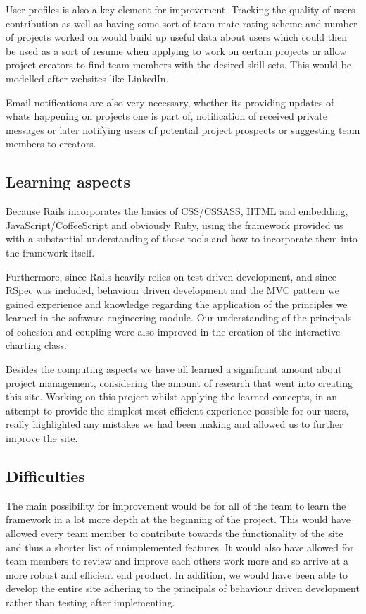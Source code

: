 \documentclass[a4wide, 11pt]{article}
\begin{document}
User profiles is also a key element for improvement. Tracking the quality of users contribution as well as having some sort of team mate rating scheme and number of projects worked on would build up useful data about users which could then be used as a sort of resume when applying to work on certain projects or allow project creators to find team members with the desired skill sets. This would be modelled after websites like LinkedIn.

Email notifications are also very necessary, whether its providing updates of whats happening on projects one is part of, notification of received private messages or later notifying users of potential project prospects or suggesting team members to creators.
 
\subsection{Learning aspects}
Because Rails incorporates the basics of CSS/CSSASS, HTML and embedding, JavaScript/CoffeeScript and obviously Ruby, using the framework provided us with a substantial understanding of these tools and how to incorporate them into the framework itself. 

Furthermore, since Rails heavily relies on test driven development, and since RSpec was included, behaviour driven development and the MVC pattern we gained experience and knowledge regarding the application of the principles we learned in the software engineering module. Our understanding of the principals of cohesion and coupling were also improved in the creation of the interactive charting class.

Besides the computing aspects we have all learned a significant amount about project management, considering the amount of research that went into creating this site. Working on this project whilst applying the learned concepts, in an attempt to provide the simplest most efficient experience possible for our users, really highlighted any mistakes we had been making and allowed us to further improve the site.
\clearpage

\subsection{Difficulties}
The main possibility for improvement would be for all of the team to learn the framework in a lot more depth at the beginning of the project. This would have allowed every team member to contribute towards the functionality of the site and thus a shorter list of unimplemented features. It would also have allowed for team members to review and improve each others work more and so arrive at a more robust and efficient end product. In addition, we would have been able to develop the entire site adhering to the principals of behaviour driven development rather than testing after implementing.
\end{document}

